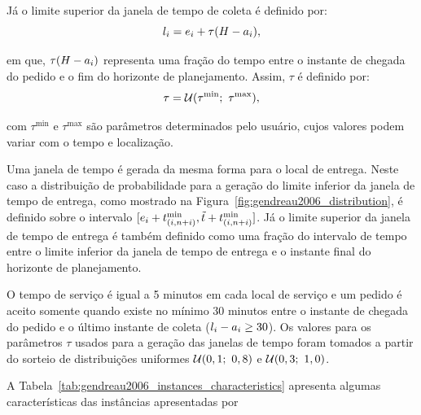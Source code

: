 Já o limite superior da janela de tempo de coleta é definido por:
%
\begin{equation}
    l_i = 
      e_i 
      + \tau(H - a_i),
\end{equation}

\noindent em que, $\tau(H - a_i)$ 
representa uma fração do tempo entre o instante de chegada do pedido e o fim 
do horizonte de planejamento. Assim, $\tau$ é definido por:
%
\begin{equation}
  \tau = \mathcal{U}(\tau^{\min};\ \tau^{\max}),
\end{equation}

\noindent com $\tau^{\min}$ e $\tau^{\max}$ são parâmetros determinados pelo 
usuário, cujos valores podem variar com o tempo e localização.

Uma janela de tempo é gerada da mesma forma para o local de entrega. 
Neste caso a distribuição de probabilidade para a geração do limite inferior 
da janela de tempo de entrega, como mostrado na 
Figura~\ref{fig:gendreau2006_distribution}, é definido sobre o intervalo
$[e_i 
+ t_{(i,n + i)}^{\min}, 
\Tilde{t} + t_{(i,n + i)}^{\min}]$.
Já o limite superior da janela de tempo de entrega é também definido como uma
fração do intervalo de tempo entre o limite inferior da janela de tempo de
entrega e o instante final do horizonte de planejamento.

O tempo de serviço é igual a 5 minutos em cada local de serviço e um pedido é 
aceito somente quando existe no mínimo 30 minutos entre o instante de chegada 
do pedido e o último instante de coleta 
($l_i - a_{i} \geq 30$). 
Os valores para os parâmetros $\tau$ usados para a geração das janelas de tempo
foram tomados a partir do sorteio de distribuições uniformes 
$\mathcal{U}(0,1;\ 0,8)$ e $\mathcal{U}(0,3;\ 1,0)$.

A Tabela~\ref{tab:gendreau2006_instances_characteristics} apresenta algumas
características das instâncias apresentadas por
\textcite{gendreau_neighborhood_2006}

